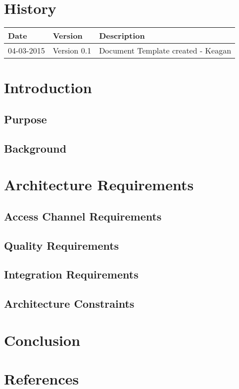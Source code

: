 \documentclass[12pt]{article}
\begin{document}


\section{History}
\begin{tabular}{|l|l|l|}
\hline
Date & Version & Description\\
\hline
04-03-2015 & Version 0.1 & Document Template created - Keagan


\end{tabular}

\newpage
\tableofcontents
\newpage
\listoffigures
\newpage

\section{Introduction}

\subsection{Purpose}

\subsection{Background}

\section{Architecture Requirements}
\subsection{Access Channel Requirements}
\subsection{Quality Requirements}
\subsection{Integration Requirements}
\subsection{Architecture Constraints}

\section{Conclusion}

\section{References}
\end{document}
